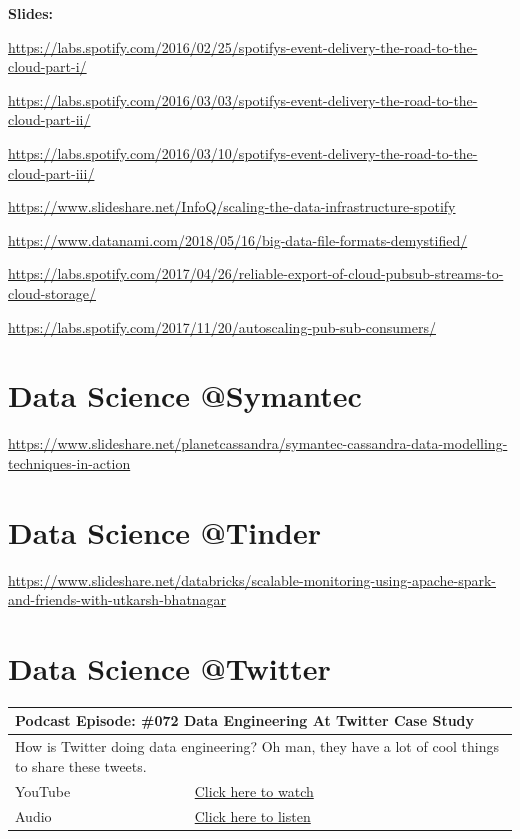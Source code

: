 \documentclass[12pt, numbers=noenddot]{scrreprt} %
\begin{document}
\textbf{Slides:}

\url{https://labs.spotify.com/2016/02/25/spotifys-event-delivery-the-road-to-the-cloud-part-i/}

\url{https://labs.spotify.com/2016/03/03/spotifys-event-delivery-the-road-to-the-cloud-part-ii/}

\url{https://labs.spotify.com/2016/03/10/spotifys-event-delivery-the-road-to-the-cloud-part-iii/}

\url{https://www.slideshare.net/InfoQ/scaling-the-data-infrastructure-spotify}

\url{https://www.datanami.com/2018/05/16/big-data-file-formats-demystified/}

\url{https://labs.spotify.com/2017/04/26/reliable-export-of-cloud-pubsub-streams-to-cloud-storage/}

\url{https://labs.spotify.com/2017/11/20/autoscaling-pub-sub-consumers/}



\section{Data Science @Symantec}
\url{https://www.slideshare.net/planetcassandra/symantec-cassandra-data-modelling-techniques-in-action}

\section{Data Science @Tinder}
\url{https://www.slideshare.net/databricks/scalable-monitoring-using-apache-spark-and-friends-with-utkarsh-bhatnagar}

\section{Data Science @Twitter}

\begin{table}[h]
\begin{tabular}{ll}
\hline
\multicolumn{2}{l}{\textbf{Podcast Episode:} \#072 Data Engineering At Twitter Case Study} \\ \hline
\multicolumn{2}{p{15cm}}{How is Twitter doing data engineering? Oh man, they have a lot of cool things to share these tweets. }         \\ \hline
\multicolumn{1}{l|}{YouTube}   & \href{https://youtu.be/UkqSR3IeLZ8}{Click here to watch}   \\
\multicolumn{1}{l|}{Audio}     & \href{https://anchor.fm/andreaskayy/episodes/072-Data-Engineering-At-Twitter-Case-Study-e45iqq}{Click here to listen}   \\ \hline
\end{tabular}
 \label{tbl:twittercasestudy}
\end{table}
\end{document}
